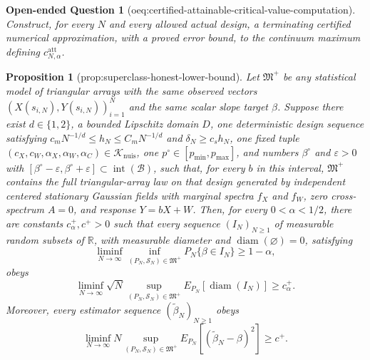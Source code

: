 \documentclass{article}
\newtheorem{proposition}{Proposition}
\newtheorem{openendedquestion}{Open-ended Question}
\begin{document}
\begin{openendedquestion}[oeq:certified-attainable-critical-value-computation]\label{oeq:certified-attainable-critical-value-computation}
Construct, for every \(N\) and every allowed actual design, a terminating certified numerical approximation, with a proved error bound, to the continuum maximum defining \(c_{N,\alpha}^{\mathrm{att}}\).
\end{openendedquestion}

\begin{proposition}[prop:superclass-honest-lower-bound]\label{prop:superclass-honest-lower-bound}
Let \(\mathfrak M^+\) be any statistical model of triangular arrays with the same observed vectors \((X(s_{i,N}),Y(s_{i,N}))_{i=1}^N\) and the same scalar slope target \(\beta\).  Suppose there exist \(d\in\{1,2\}\), a bounded Lipschitz domain \(D\), one deterministic design sequence satisfying \(c_mN^{-1/d}\leq h_N\leq C_mN^{-1/d}\) and \(\delta_N\geq c_sh_N\), one fixed tuple \((c_X,c_W,\alpha_X,\alpha_W,\alpha_C)\in\mathcal K_{\mathrm{nuis}}\), one \(p^\circ\in[p_{\min},p_{\max}]\), and numbers \(\beta^\circ\) and \(\varepsilon>0\) with \([\beta^\circ-\varepsilon,\beta^\circ+\varepsilon]\subset\operatorname{int}(\mathcal B)\), such that, for every \(b\) in this interval, \(\mathfrak M^+\) contains the full triangular-array law on that design generated by independent centered stationary Gaussian fields with marginal spectra \(f_X\) and \(f_W\), zero cross-spectrum \(A=0\), and response \(Y=bX+W\).  Then, for every \(0<\alpha<1/2\), there are constants \(c^+_\alpha,c^+>0\) such that every sequence \((I_N)_{N\geq1}\) of measurable random subsets of \(\mathbb R\), with measurable diameter and \(\operatorname{diam}(\varnothing)=0\), satisfying
\[
 \liminf_{N\to\infty}\inf_{(P_N,\mathcal S_N)\in\mathfrak M^+}
 P_N\{\beta\in I_N\}\geq1-\alpha,
\]
obeys
\[
 \liminf_{N\to\infty}\sqrt N
 \sup_{(P_N,\mathcal S_N)\in\mathfrak M^+}
 E_{P_N}[\operatorname{diam}(I_N)]\geq c^+_\alpha.
\]
Moreover, every estimator sequence \((\widetilde\beta_N)_{N\geq1}\) obeys
\[
 \liminf_{N\to\infty}N
 \sup_{(P_N,\mathcal S_N)\in\mathfrak M^+}
 E_{P_N}[(\widetilde\beta_N-\beta)^2]\geq c^+.
\]
\end{proposition}
\end{document}
